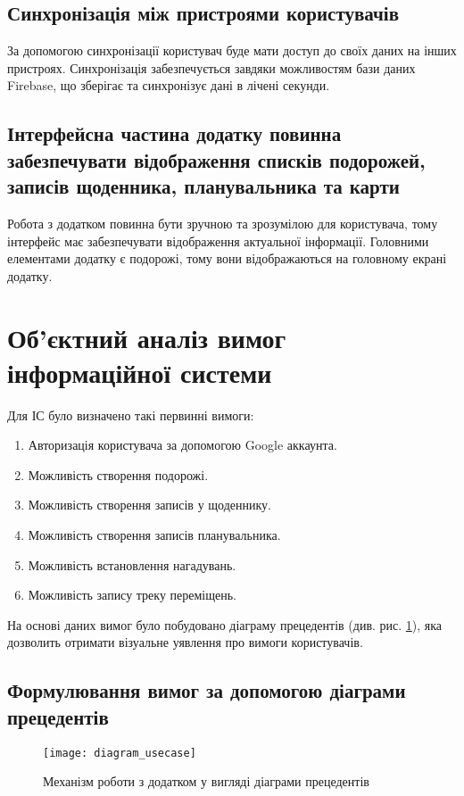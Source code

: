 \documentclass[../main.tex]{subfiles}
\begin{document}
\subsection{Синхронізація між пристроями користувачів}
За допомогою синхронізації користувач буде мати доступ до своїх даних на інших пристроях. Синхронізація забезпечується завдяки можливостям бази даних Firebase, що зберігає та синхронізує дані в лічені секунди.

\subsection{Інтерфейсна частина додатку повинна забезпечувати відображення списків подорожей, записів щоденника, планувальника та карти}
Робота з додатком повинна бути зручною та зрозумілою для користувача, тому інтерфейс має забезпечувати відображення актуальної інформації. Головними елементами додатку є подорожі, тому вони відображаються на головному екрані додатку.

\section{Об'єктний аналіз вимог інформаційної системи}

Для ІС було визначено такі первинні вимоги:
\begin{enumerate}
	\item Авторизація користувача за допомогою Google аккаунта.
	\item Можливість створення подорожі.
	\item Можливість створення записів у щоденнику.
	\item Можливість створення записів планувальника.
	\item Можливість встановлення нагадувань.
	\item Можливість запису треку переміщень.
\end{enumerate}

На основі даних вимог було побудовано діаграму прецедентів (див. рис. \ref{diagram:1}), яка дозволить отримати візуальне уявлення про вимоги користувачів.

\subsection{Формулювання вимог за допомогою діаграми прецедентів}
\begin{figure}[H]
	\centering
	\texttt{[image: diagram\_usecase]}
	\caption{Механізм роботи з додатком у вигляді діаграми прецедентів}
	\label{diagram:1}
\end{figure}

\end{document}
